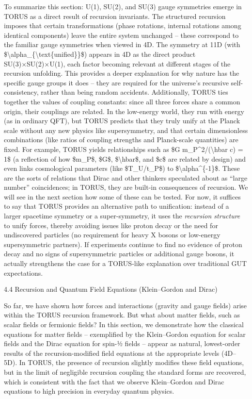 \documentclass[
]{article}
\begin{document}
To summarize this section: U(1), SU(2), and SU(3) gauge symmetries
emerge in TORUS as a direct result of recursion invariants. The
structured recursion imposes that certain transformations (phase
rotations, internal rotations among identical components) leave the
entire system unchanged -- these correspond to the familiar gauge
symmetries when viewed in 4D. The symmetry at 11D (with
\$\textbackslash alpha\_\{\textbackslash text\{unified\}\}\$) appears in
4D as the direct product SU(3)×SU(2)×U(1), each factor becoming relevant
at different stages of the recursion unfolding. This provides a deeper
explanation for why nature has the specific gauge groups it does -- they
are required for the universe's recursive self-consistency, rather than
being random accidents. Additionally, TORUS ties together the values of
coupling constants: since all three forces share a common origin, their
couplings are related. In the low-energy world, they run with energy (as
in ordinary QFT), but TORUS predicts that they truly unify at the Planck
scale without any new physics like supersymmetry, and that certain
dimensionless combinations (like ratios of coupling strengths and
Planck-scale quantities) are fixed. For example, TORUS yields
relationships such as \$G m\_P\^{}2/(\textbackslash hbar c) = 1\$ (a
reflection of how \$m\_P\$, \$G\$, \$\textbackslash hbar\$, and \$c\$
are related by design) and even links cosmological parameters (like
\$T\_U/t\_P\$) to \$\textbackslash alpha\^{}\{-1\}\$. These are the
sorts of relations that Dirac and other thinkers speculated about as
``large number'' coincidences; in TORUS, they are built-in consequences
of recursion. We will see in the next section how some of these can be
tested. For now, it suffices to say that TORUS provides an alternative
path to unification: instead of a larger spacetime symmetry or a
super-symmetry, it uses the \emph{recursion structure} to unify forces,
thereby avoiding issues like proton decay or the need for undiscovered
particles (no requirement for heavy X bosons or low-energy
supersymmetric partners). If experiments continue to find no evidence of
proton decay and no signs of supersymmetric particles or additional
gauge bosons, it actually strengthens the case for a TORUS-like
explanation over traditional GUT expectations.

4.4 Recursion and Quantum Field Equations (Klein--Gordon and Dirac)

So far, we have shown how forces and interactions (gravity and gauge
fields) arise within the TORUS recursion framework. But what about
matter fields, such as scalar fields or fermionic fields? In this
section, we demonstrate how the classical equations for matter fields --
exemplified by the Klein--Gordon equation for scalar fields and the
Dirac equation for spin-½ fields -- appear as natural, lowest-order
results of the recursion-modified field equations at the appropriate
levels (4D--5D). In TORUS, the presence of recursion slightly modifies
these field equations, but in the limit of negligible recursion coupling
the standard forms are recovered, which is consistent with the fact that
we observe Klein--Gordon and Dirac equations to high precision in
everyday quantum physics.
\end{document}
